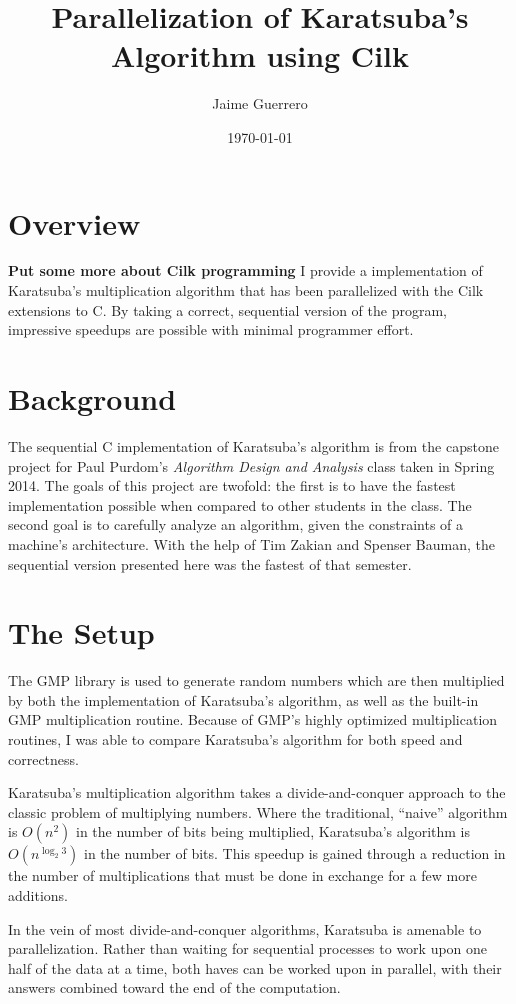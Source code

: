 \documentclass[8pt, twocolumn]{article}
\author{Jaime Guerrero}
\title{Parallelization of Karatsuba's Algorithm using Cilk}
\date{\today}
\begin{document}
\maketitle

\section{Overview}
\textbf{Put some more about Cilk programming}
I provide a implementation of Karatsuba's multiplication algorithm that has
been parallelized with the Cilk extensions to C.  By taking a correct,
sequential version of the program, impressive speedups are possible with
minimal programmer effort.

\section{Background}
The sequential C implementation of Karatsuba's algorithm is from the capstone
project for Paul Purdom's \textit{Algorithm Design and Analysis} class taken in
Spring 2014.  The goals of this project are twofold: the first is to have the
fastest implementation possible when compared to other students in the class.
The second goal is to carefully analyze an algorithm, given the constraints of
a machine's architecture.  With the help of Tim Zakian and Spenser Bauman, the
sequential version presented here was the fastest of that semester.

\section{The Setup}
The GMP library is used to generate random numbers which are then multiplied
by both the implementation of Karatsuba's algorithm, as well as the built-in
GMP multiplication routine.  Because of GMP's highly optimized multiplication
routines, I was able to compare Karatsuba's algorithm for both speed and
correctness.

Karatsuba's multiplication algorithm takes a divide-and-conquer approach to
the classic problem of multiplying numbers.  Where the traditional, ``naive''
algorithm is $O(n^2)$ in the number of bits being multiplied, Karatsuba's
algorithm is $O(n^{\log_2 3})$ in the number of bits.  This speedup is gained
through a reduction in the number of multiplications that must be done in
exchange for a few more additions.

In the vein of most divide-and-conquer algorithms, Karatsuba is amenable to
parallelization.  Rather than waiting for sequential processes to work upon one
half of the data at a time, both haves can be worked upon in parallel, with
their answers combined toward the end of the computation.
\end{document}
